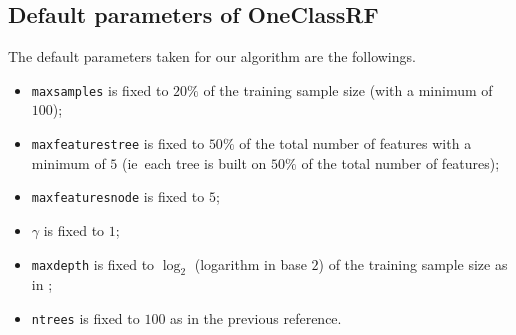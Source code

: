\subsection{Default parameters of OneClassRF}
The default parameters taken for our algorithm are the followings.
%
\begin{itemize}
    \item \texttt{max\textunderscore samples} is fixed to $20\%$ of the
    training sample size (with a minimum of $100$);
    \item \texttt{max\textunderscore features\textunderscore tree} is fixed to
    $50\%$ of the total number of features with a minimum of $5$ (\acs{ie}~each
    tree is built on $50\%$ of the total number of features);
    \item \texttt{max\textunderscore features\textunderscore node} is fixed to
    $5$;
    \item $\gamma$ is fixed to $1$;
    \item \texttt{max\textunderscore depth} is fixed to $\log_2$ (logarithm in
    base $2$) of the training sample size as in \citet{Liu2008};
    \item \texttt{n\textunderscore trees} is fixed to $100$ as in the previous
    reference. 
\end{itemize}
